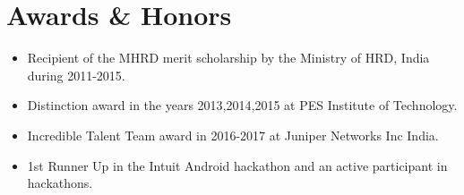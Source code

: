 \documentclass[letterpaper,11pt]{article}
\begin{document}
\section{Awards \& Honors}  
\begin{itemize}[noitemsep]
\item {Recipient of the MHRD merit scholarship by the Ministry of HRD, India during 2011-2015.}
\item {Distinction award in the years 2013,2014,2015 at PES Institute of Technology.}
\item {Incredible Talent Team award in 2016-2017 at Juniper Networks Inc India.}
\item {1st Runner Up in the Intuit Android hackathon and an active participant in hackathons. }
\end{itemize}
  

\end{document}
